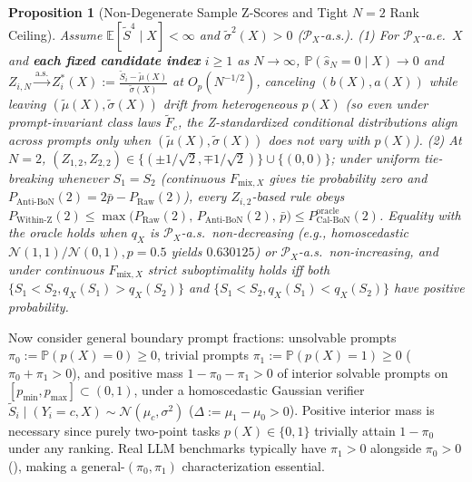 \documentclass[10pt]{article}
\theoremstyle{plain}
\newtheorem{proposition}{Proposition}
\theoremstyle{definition}
\theoremstyle{remark}
\newcommand{\E}{\mathbb{E}}
\newcommand{\Prob}{\mathbb{P}}
\begin{document}
\begin{proposition}[Non-Degenerate Sample Z-Scores and Tight $N=2$ Rank Ceiling]
\label{prop:zscore-n2}
Assume $\E[\tilde{S}^4 \mid X] < \infty$ and $\tilde{\sigma}^2(X) > 0$ ($\mathcal{P}_X$-a.s.). (1) For $\mathcal{P}_X$-a.e.\ $X$ and \textbf{each fixed candidate index} $i \ge 1$ as $N \to \infty$, $\Prob(\hat{s}_N = 0 \mid X) \to 0$ and $Z_{i,N} \xrightarrow{\mathrm{a.s.}} Z_i^*(X) := \frac{\tilde{S}_i - \tilde{\mu}(X)}{\tilde{\sigma}(X)}$ at $O_p(N^{-1/2})$, canceling $(b(X), a(X))$ while leaving $(\tilde{\mu}(X), \tilde{\sigma}(X))$ drift from heterogeneous $p(X)$ (so even under prompt-invariant class laws $\tilde{F}_c$, the Z-standardized conditional distributions align across prompts only when $(\tilde{\mu}(X), \tilde{\sigma}(X))$ does not vary with $p(X)$). (2) At $N = 2$, $(Z_{1,2}, Z_{2,2}) \in \{(\pm 1/\sqrt{2}, \mp 1/\sqrt{2})\} \cup \{(0, 0)\}$; under uniform tie-breaking whenever $S_1 = S_2$ (continuous $F_{\mathrm{mix}, X}$ gives tie probability zero and $P_{\mathrm{Anti\text{-}BoN}}(2) = 2\bar{p} - P_{\mathrm{Raw}}(2)$), every $Z_{i,2}$-based rule obeys $P_{\mathrm{Within\text{-}Z}}(2) \le \max\big(P_{\mathrm{Raw}}(2),\, P_{\mathrm{Anti\text{-}BoN}}(2),\, \bar{p}\big) \le P_{\mathrm{Cal\text{-}BoN}}^{\mathrm{oracle}}(2)$. Equality with the oracle holds when $q_X$ is $\mathcal{P}_X$-a.s.\ non-decreasing (e.g., homoscedastic $\mathcal{N}(1,1)/\mathcal{N}(0,1), p=0.5$ yields $0.630125$) or $\mathcal{P}_X$-a.s.\ non-increasing, and under continuous $F_{\mathrm{mix},X}$ strict suboptimality holds \emph{iff} both $\{S_1 < S_2, q_X(S_1) > q_X(S_2)\}$ and $\{S_1 < S_2, q_X(S_1) < q_X(S_2)\}$ have positive probability.
\end{proposition}

Now consider general boundary prompt fractions: unsolvable prompts $\pi_0 := \Prob(p(X) = 0) \ge 0$, trivial prompts $\pi_1 := \Prob(p(X) = 1) \ge 0$ ($\pi_0 + \pi_1 > 0$), and positive mass $1 - \pi_0 - \pi_1 > 0$ of interior solvable prompts on $[p_{\min}, p_{\max}] \subset (0, 1)$, under a homoscedastic Gaussian verifier $\tilde{S}_i \mid (Y_i = c, X) \sim \mathcal{N}(\mu_c, \sigma^2)$ ($\Delta := \mu_1 - \mu_0 > 0$). Positive interior mass is necessary since purely two-point tasks $p(X) \in \{0, 1\}$ trivially attain $1 - \pi_0$ under any ranking. Real LLM benchmarks typically have $\pi_1 > 0$ alongside $\pi_0 > 0$ (), making a general-$(\pi_0, \pi_1)$ characterization essential.
\end{document}

